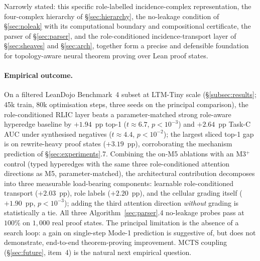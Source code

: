 \documentclass[11pt]{article}
\theoremstyle{definition}
\theoremstyle{plain}
\begin{document}
Narrowly stated: this specific role-labelled incidence-complex representation, the four-complex hierarchy of \S\ref{sec:hierarchy}, the no-leakage condition of \S\ref{sec:noleak} with its computational boundary and compositional certificate, the parser of \S\ref{sec:parser}, and the role-conditioned incidence-transport layer of \S\ref{sec:sheaves} and \S\ref{sec:arch}, together form a precise and defensible foundation for topology-aware neural theorem proving over Lean proof states.

\paragraph{Empirical outcome.} On a filtered LeanDojo Benchmark~4 subset at LTM-Tiny scale (\S\ref{subsec:results}; 45k train, 80k optimisation steps, three seeds on the principal comparison), the role-conditioned RLIC layer beats a parameter-matched strong role-aware hyperedge baseline by $+1.94$~pp top-1 ($t \approx 6.7$, $p < 10^{-3}$) and $+2.64$~pp Task-C AUC under synthesised negatives ($t \approx 4.4$, $p < 10^{-2}$); the largest sliced top-1 gap is on rewrite-heavy proof states ($+3.19$~pp), corroborating the mechanism prediction of \S\ref{sec:experiments}.7. Combining the on-M5 ablations with an M3$^{+}$ control (typed hyperedges with the same three role-conditioned attention directions as M5, parameter-matched), the architectural contribution decomposes into three measurable load-bearing components: learnable role-conditioned transport ($+2.03$~pp), role labels ($+2.20$~pp), and the cellular grading itself ($+1.90$~pp, $p < 10^{-3}$); adding the third attention direction \emph{without} grading is statistically a tie. All three Algorithm~\ref{sec:parser}.4 no-leakage probes pass at $100\%$ on $1{,}000$ real proof states. The principal limitation is the absence of a search loop: a gain on single-step Mode-1 prediction is suggestive of, but does not demonstrate, end-to-end theorem-proving improvement. MCTS coupling (\S\ref{sec:future}, item~4) is the natural next empirical question.
\end{document}
